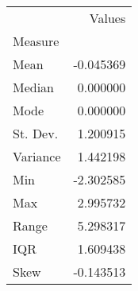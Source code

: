 \begin{tabu}{lr}
\toprule
 & Values \\
Measure &  \\
\midrule
Mean & -0.045369 \\
Median & 0.000000 \\
Mode & 0.000000 \\
St. Dev. & 1.200915 \\
Variance & 1.442198 \\
Min & -2.302585 \\
Max & 2.995732 \\
Range & 5.298317 \\
IQR & 1.609438 \\
Skew & -0.143513 \\
\bottomrule
\end{tabu}
